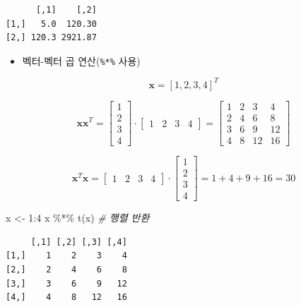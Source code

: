 \documentclass[
  11pt,
]{krantz}
\newenvironment{Shaded}{\begin{snugshade}}{\end{snugshade}}
\newcommand{\CommentTok}[1]{\textcolor[rgb]{0.37,0.37,0.37}{\textit{#1}}}
\newcommand{\DecValTok}[1]{\textcolor[rgb]{0.06,0.06,0.06}{#1}}
\newcommand{\FunctionTok}[1]{\textcolor[rgb]{0,0,0}{#1}}
\newcommand{\NormalTok}[1]{#1}
\newcommand{\OtherTok}[1]{\textcolor[rgb]{0.37,0.37,0.37}{#1}}
\newcommand{\SpecialCharTok}[1]{\textcolor[rgb]{0,0,0}{#1}}
\providecommand{\tightlist}{%
  \setlength{\itemsep}{0pt}\setlength{\parskip}{0pt}}
\begin{document}
\begin{verbatim}
      [,1]    [,2]
[1,]   5.0  120.30
[2,] 120.3 2921.87
\end{verbatim}

\normalsize

\begin{itemize}
\tightlist
\item
  벡터-벡터 곱 연산(\texttt{\%*\%} 사용)
\end{itemize}

\[
\mathrm{\mathbf x} = [1, 2, 3, 4]^T
\]

\[\mathrm{\mathbf x}\mathrm{\mathbf x}^T = 
\begin{bmatrix}
1 \\
2 \\
3 \\
4
\end{bmatrix} \cdot
\begin{bmatrix}
1 & 2 & 3 & 4
\end{bmatrix} = 
\begin{bmatrix}
1 & 2 & 3 & 4 \\
2 & 4 & 6 & 8 \\
3 & 6 & 9 & 12 \\
4 & 8 & 12 & 16
\end{bmatrix}
\]

\[\mathrm{\mathbf x}^T\mathrm{\mathbf x} = 
\begin{bmatrix}
1 & 2 & 3 & 4
\end{bmatrix} \cdot
\begin{bmatrix}
1 \\
2 \\
3 \\
4
\end{bmatrix} = 1 + 4 + 9 + 16 = 30
\]

\footnotesize

\begin{Shaded}
\begin{Highlighting}[]
\NormalTok{x }\OtherTok{\textless{}{-}} \DecValTok{1}\SpecialCharTok{:}\DecValTok{4}
\NormalTok{x }\SpecialCharTok{\%*\%} \FunctionTok{t}\NormalTok{(x) }\CommentTok{\# 행렬 반환}
\end{Highlighting}
\end{Shaded}

\begin{verbatim}
     [,1] [,2] [,3] [,4]
[1,]    1    2    3    4
[2,]    2    4    6    8
[3,]    3    6    9   12
[4,]    4    8   12   16
\end{verbatim}
\end{document}
